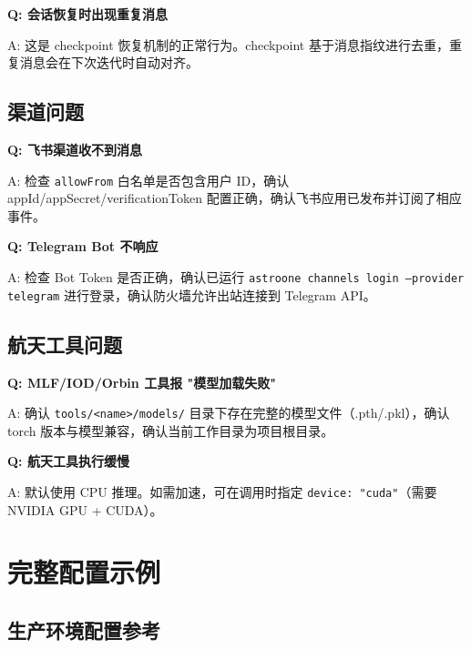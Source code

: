\documentclass[12pt,a4paper,UTF8]{ctexart}
\begin{document}
\begin{notebox}
\textbf{Q: 会话恢复时出现重复消息}

A: 这是 checkpoint 恢复机制的正常行为。checkpoint 基于消息指纹进行去重，重复消息会在下次迭代时自动对齐。
\end{notebox}

\section{渠道问题}

\begin{notebox}
\textbf{Q: 飞书渠道收不到消息}

A: 检查 \texttt{allowFrom} 白名单是否包含用户 ID，确认 appId/appSecret/verificationToken 配置正确，确认飞书应用已发布并订阅了相应事件。
\end{notebox}

\begin{notebox}
\textbf{Q: Telegram Bot 不响应}

A: 检查 Bot Token 是否正确，确认已运行 \texttt{astroone channels login --provider telegram} 进行登录，确认防火墙允许出站连接到 Telegram API。
\end{notebox}

\section{航天工具问题}

\begin{notebox}
\textbf{Q: MLF/IOD/Orbin 工具报 "模型加载失败"}

A: 确认 \texttt{tools/<name>/models/} 目录下存在完整的模型文件（.pth/.pkl），确认 torch 版本与模型兼容，确认当前工作目录为项目根目录。
\end{notebox}

\begin{notebox}
\textbf{Q: 航天工具执行缓慢}

A: 默认使用 CPU 推理。如需加速，可在调用时指定 \texttt{device: "cuda"}（需要 NVIDIA GPU + CUDA）。
\end{notebox}

\appendix
\chapter{完整配置示例}

\section{生产环境配置参考}
\end{document}

